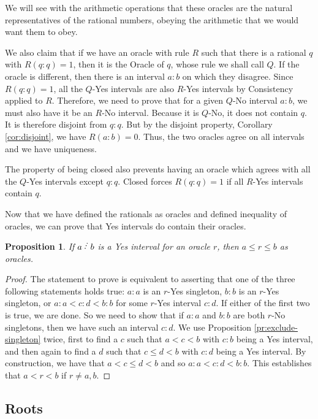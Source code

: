 \documentclass[12pt]{article}
\newtheorem{proposition}{Proposition}[subsection]
\begin{document}
We will see with the arithmetic operations that these oracles are the natural representatives of the rational numbers, obeying the arithmetic that we would want them to obey.  

We also claim that if we have an oracle with rule $R$ such that there is a rational $q$ with $R(q:q)=1$, then it is the Oracle of $q$, whose rule we shall call $Q$. If the oracle is different, then there is an interval $a:b$ on which they disagree. Since $R(q:q) =1$, all the  $Q$-Yes intervals are also $R$-Yes intervals by Consistency applied to $R$. Therefore, we need to prove that for a given  $Q$-No interval $a:b$, we must also have it be an $R$-No interval. Because it is $Q$-No, it does not contain $q$. It is therefore disjoint from $q:q$. But by the disjoint property, Corollary \ref{cor:disjoint}, we have $R(a:b)=0$. Thus, the two oracles agree on all intervals and we have uniqueness. 

The property of being closed also prevents having an oracle which agrees with all the $Q$-Yes intervals except $q:q$. Closed forces $R(q:q)=1$ if all $R$-Yes intervals contain $q$.

Now that we have defined the rationals as oracles and defined inequality of oracles, we can prove that Yes intervals do contain their oracles.

\begin{proposition}\label{pr:yes-trap}
    If $a\lte b$ is a Yes interval for an oracle $r$, then $a \leq r \leq b$ as oracles.
\end{proposition}

\begin{proof}
    The statement to prove is equivalent to asserting that one of the three following statements holds true: $a:a$ is an $r$-Yes singleton,  $b:b$ is an $r$-Yes singleton, or $a:a < c:d < b:b$ for some $r$-Yes interval $c:d$.  If either of the first two is true, we are done. So we need to show that if $a:a$ and $b:b$ are both $r$-No singletons, then we have such an interval $c:d$. We use Proposition \ref{pr:exclude-singleton} twice, first to find a $c$ such that $a < c < b$ with $c:b$ being a Yes interval, and then again to find a $d$ such that $c \leq d < b$ with $c:d$ being a Yes interval. By construction, we have that $a < c \leq d < b$ and so $a:a < c:d < b:b$. This establishes that $a < r < b$ if $r \neq a, b$.  
\end{proof}


\subsection{Roots}\label{sec:roots}
\end{document}

